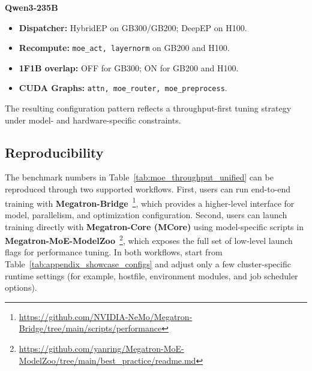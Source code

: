 \documentclass[10pt,logo,copyright]{nvidiatechreport}
\begin{document}
\textbf{Qwen3-235B}
\begin{itemize}[noitemsep,topsep=0pt]
    \item \textbf{Dispatcher:} HybridEP on GB300/GB200; DeepEP on H100.
    \item \textbf{Recompute:} \texttt{moe\_act, layernorm} on GB200 and H100.
    \item \textbf{1F1B overlap:} OFF for GB300; ON for GB200 and H100.
    \item \textbf{CUDA Graphs:} \texttt{attn, moe\_router, moe\_preprocess}.
\end{itemize}
The resulting configuration pattern reflects a throughput-first tuning strategy under model- and hardware-specific constraints.

\subsection{Reproducibility} 
The benchmark numbers in Table~\ref{tab:moe_throughput_unified} can be reproduced through two supported workflows. First, users can run end-to-end training with \textbf{Megatron-Bridge}~\footnote{\url{https://github.com/NVIDIA-NeMo/Megatron-Bridge/tree/main/scripts/performance}}, which provides a higher-level interface for model, parallelism, and optimization configuration. Second, users can launch training directly with \textbf{Megatron-Core (MCore)} using model-specific scripts in \textbf{Megatron-MoE-ModelZoo}~\footnote{\url{https://github.com/yanring/Megatron-MoE-ModelZoo/tree/main/best_practice/readme.md}}, which exposes the full set of low-level launch flags for performance tuning. In both workflows, start from Table~\ref{tab:appendix_showcase_configs} and adjust only a few cluster-specific runtime settings (for example, hostfile, environment modules, and job scheduler options).
\end{document}

